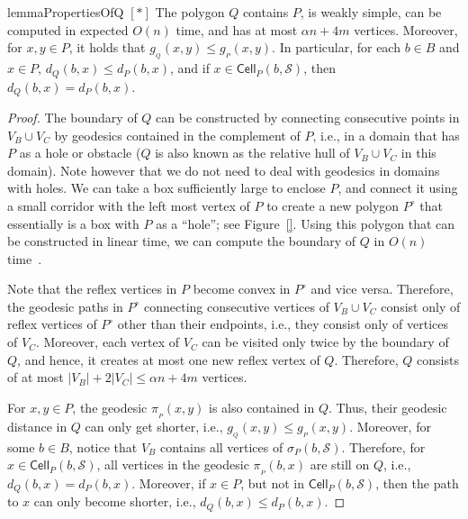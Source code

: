 \documentclass[a4paper,UKenglish]{socg-lipics-v2018}
\newcommand{\s}{\mathcal S}
\newcommand{\g}[3][P]{\ensuremath{g{_{_{#1}}}(#2, #3)}}
\newcommand{\dd}[3][P]{\ensuremath{d_{#1}(#2, #3)}}
\newcommand{\p}[3][P]{\ensuremath{\pi_{_{#1}}(#2, #3)}}
\newcommand{\funnel}[2][P]{\ensuremath{\sigma_{\scriptscriptstyle #1}(#2)}}
\newcommand{\cell}[2][P]{\ensuremath{\mathsf{Cell}_{\scriptscriptstyle #1}(#2)}}
\begin{document}
\begin{restatable}{lemma}{PropertiesOfQ}\label{lemma:PropertiesOfQ}
$[*]$ The polygon $Q$ contains $P$, is weakly simple, can be computed in expected $O(n)$ time, and has at most $\alpha n + 4m$ vertices.
Moreover, for $x,y\in P$, it holds that $\g[Q]{x}{y} \leq \g{x}{y}$. 
In particular, for each $b\in B$ and $x\in P$, $\dd[Q]{b}{x} \leq \dd{b}{x}$, and if $x\in \cell{b, \s}$, then $\dd[Q]{b}{x} = \dd{b}{x}$.
\end{restatable}
\begin{proof}
The boundary of $Q$ can be constructed by connecting consecutive  points in $V_B\cup V_C$ by geodesics contained in the complement of $P$, i.e., in a domain that has $P$ as a hole or obstacle ($Q$ is also known as the relative hull of $V_B\cup V_C$ in this domain). 
Note however that we do not need to deal with geodesics in domains with holes. 
We can take a box sufficiently large to enclose $P$, and connect it using a small corridor with the left most vertex of $P$ to create a new polygon $P^\circ$ that essentially is a box with $P$ as a ``hole''; see Figure~\ref{}. 
Using this polygon that can be constructed in linear time, we can compute the boundary of $Q$ in $O(n)$ time~\cite[Lemma 2]{kpairpath}.

Note that the reflex vertices in $P$ become convex in $P^\circ$ and vice versa. 
Therefore, the geodesic paths in $P^\circ$ connecting consecutive vertices of $V_B\cup V_C$ consist only of reflex vertices of $P^\circ$ other than their endpoints, i.e., they consist only of vertices of $V_C$.  
Moreover, each vertex of $V_C$ can be visited only twice by the boundary of $Q$, and hence, it creates at most one new reflex vertex of $Q$.
Therefore, $Q$ consists of at most $|V_B| +  2|V_C| \leq \alpha n + 4m$ vertices.

For $x,y\in P$, the geodesic $\p{x}{y}$ is also contained in $Q$. Thus, their geodesic distance in $Q$ can only get shorter, i.e., $\g[Q]{x}{y} \leq \g{x}{y}$.
Moreover, for some $b\in B$, notice that $V_B$ contains all vertices of $\funnel{b, \s}$. Therefore, for $x\in \cell{b,\s}$, all vertices in the geodesic $\p{b}{x}$ are still on $Q$, i.e., $\dd[Q]{b}{x} = \dd{b}{x}$. Moreover, if $x\in P$, but not in $\cell{b,\s}$, then the path to $x$ can only become shorter, i.e., $\dd[Q]{b}{x} \leq \dd{b}{x}$.
\end{proof}
\end{document}
